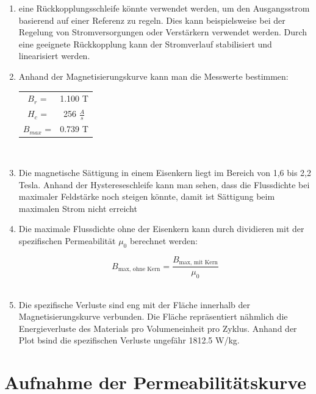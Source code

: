 \documentclass[a4paper,twoside,12pt,DIV=13,BCOR=5mm,numbers=noenddot,cleardoublepage=empty]{scrbook}
\begin{document}
\begin{enumerate}
            \item eine Rückkopplungsschleife könnte verwendet werden, um den Ausgangsstrom basierend auf einer Referenz zu regeln. Dies kann beispielsweise bei der Regelung von Stromversorgungen oder Verstärkern verwendet werden. Durch eine geeignete Rückkopplung kann der Stromverlauf stabilisiert und linearisiert werden.\\
            \item Anhand der Magnetisierungskurve kann man die Messwerte bestimmen: \\
            \begin{tabular}{cc}
                $B_r$ =& 1.100 T  \\
                $H_c$ =& 256 $\frac{A}{s}$ \\
                $B_{max}$ =& 0.739 T

            \end{tabular}\\
            \item Die magnetische Sättigung in einem Eisenkern  liegt im Bereich von 1,6 bis 2,2 Tesla. Anhand der Hystereseschleife kann man sehen, dass die Flussdichte bei maximaler Feldstärke noch steigen könnte, damit ist Sättigung beim maximalen Strom nicht erreicht\\
            \item Die maximale Flussdichte ohne der Eisenkern kann durch dividieren mit der spezifischen Permeabilität $\mu_0$ berechnet werden:

                \begin{equation}
                B_{\text{max, ohne Kern}} = \frac{B_{\text{max, mit Kern}}}{\mu_0}
                \end{equation}\\ 
            \item Die spezifische Verluste sind eng mit der Fläche innerhalb der Magnetisierungskurve verbunden. Die Fläche repräsentiert nähmlich die Energieverluste des Materials pro Volumeneinheit pro Zyklus. Anhand der Plot bsind die spezifischen Verluste ungefähr 1812.5 W/kg.
        
        \end{enumerate}

        \section{Aufnahme der Permeabilit\"atskurve}
\end{document}
